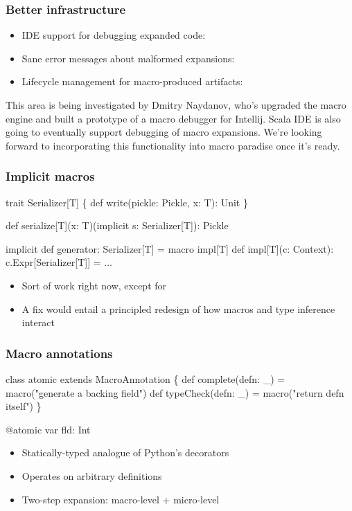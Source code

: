 \documentclass[svgnames,hyperref={bookmarks=false}]{beamer}
\begin{document}
\begin{frame}[fragile]
\frametitle{Better infrastructure}

\begin{itemize}
\item IDE support for debugging expanded code: 
\item Sane error messages about malformed expansions: 
\item Lifecycle management for macro-produced artifacts: 
\end{itemize}

This area is being investigated by Dmitry Naydanov, who's upgraded the macro engine and built a prototype of a macro debugger for Intellij. Scala IDE is also going to eventually support debugging of macro expansions. We're looking forward to incorporating this functionality into macro paradise once it's ready.
\end{frame}

\begin{frame}[fragile]
\frametitle{Implicit macros}
\begin{semiverbatim}
trait Serializer[T] \{
  def write(pickle: Pickle, x: T): Unit
\}

def serialize[T](x: T)(implicit s: Serializer[T]): Pickle

implicit def generator: Serializer[T] = macro impl[T]
def impl[T](c: Context): c.Expr[Serializer[T]] = ...

\end{semiverbatim}

\begin{itemize}
\item Sort of work right now, except for 
\item A fix would entail a principled redesign of how macros and type inference interact 
\end{itemize}
\end{frame}

\begin{frame}[fragile]
\frametitle{Macro annotations}
\begin{semiverbatim}
class atomic extends MacroAnnotation \{
  def complete(defn: _) = macro("generate a backing field")
  def typeCheck(defn: _) = macro("return defn itself")
\}

@atomic var fld: Int

\end{semiverbatim}

\begin{itemize}
\item Statically-typed analogue of Python's decorators
\item Operates on arbitrary definitions
\item Two-step expansion: macro-level + micro-level
\end{itemize}
\end{frame}
\end{document}
